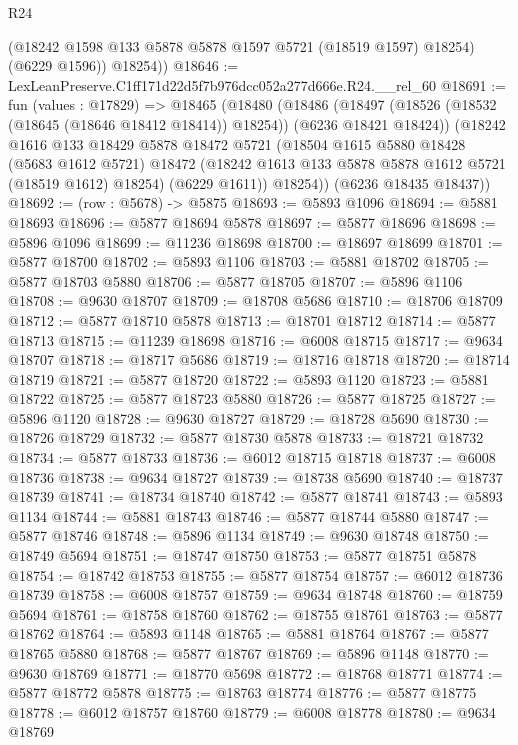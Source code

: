 \begin{lexlean}{R24}
\begin{coremodule}
          (@18242 @1598 @133 @5878 @5878 @1597 @5721 (@18519 @1597) @18254)
          (@6229 @1596))
        @18254))
@18646 := LexLeanPreserve.C1ff171d22d5f7b976dcc052a277d666e.R24.__rel_60
@18691 := fun (values : @17829) =>
  @18465
    (@18480
      (@18486
        (@18497 (@18526 (@18532 (@18645 (@18646 @18412 @18414)) @18254)) (@6236 @18421 @18424))
        (@18242
          @1616
          @133
          @18429
          @5878
          @18472
          @5721
          (@18504
            @1615
            @5880
            @18428
            (@5683 @1612 @5721)
            @18472
            (@18242 @1613 @133 @5878 @5878 @1612 @5721 (@18519 @1612) @18254)
            (@6229 @1611))
          @18254))
      (@6236 @18435 @18437))
@18692 := (row : @5678) -> @5875
@18693 := @5893 @1096
@18694 := @5881 @18693
@18696 := @5877 @18694 @5878
@18697 := @5877 @18696
@18698 := @5896 @1096
@18699 := @11236 @18698
@18700 := @18697 @18699
@18701 := @5877 @18700
@18702 := @5893 @1106
@18703 := @5881 @18702
@18705 := @5877 @18703 @5880
@18706 := @5877 @18705
@18707 := @5896 @1106
@18708 := @9630 @18707
@18709 := @18708 @5686
@18710 := @18706 @18709
@18712 := @5877 @18710 @5878
@18713 := @18701 @18712
@18714 := @5877 @18713
@18715 := @11239 @18698
@18716 := @6008 @18715
@18717 := @9634 @18707
@18718 := @18717 @5686
@18719 := @18716 @18718
@18720 := @18714 @18719
@18721 := @5877 @18720
@18722 := @5893 @1120
@18723 := @5881 @18722
@18725 := @5877 @18723 @5880
@18726 := @5877 @18725
@18727 := @5896 @1120
@18728 := @9630 @18727
@18729 := @18728 @5690
@18730 := @18726 @18729
@18732 := @5877 @18730 @5878
@18733 := @18721 @18732
@18734 := @5877 @18733
@18736 := @6012 @18715 @18718
@18737 := @6008 @18736
@18738 := @9634 @18727
@18739 := @18738 @5690
@18740 := @18737 @18739
@18741 := @18734 @18740
@18742 := @5877 @18741
@18743 := @5893 @1134
@18744 := @5881 @18743
@18746 := @5877 @18744 @5880
@18747 := @5877 @18746
@18748 := @5896 @1134
@18749 := @9630 @18748
@18750 := @18749 @5694
@18751 := @18747 @18750
@18753 := @5877 @18751 @5878
@18754 := @18742 @18753
@18755 := @5877 @18754
@18757 := @6012 @18736 @18739
@18758 := @6008 @18757
@18759 := @9634 @18748
@18760 := @18759 @5694
@18761 := @18758 @18760
@18762 := @18755 @18761
@18763 := @5877 @18762
@18764 := @5893 @1148
@18765 := @5881 @18764
@18767 := @5877 @18765 @5880
@18768 := @5877 @18767
@18769 := @5896 @1148
@18770 := @9630 @18769
@18771 := @18770 @5698
@18772 := @18768 @18771
@18774 := @5877 @18772 @5878
@18775 := @18763 @18774
@18776 := @5877 @18775
@18778 := @6012 @18757 @18760
@18779 := @6008 @18778
@18780 := @9634 @18769

\end{coremodule}
\end{lexlean}
